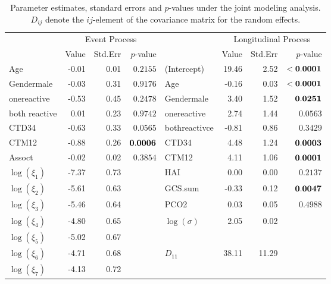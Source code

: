\documentclass{article}
\begin{document}
\begin{table}[H]
\centering
\begin{tabular}{lrrrlrrr}
  \hline
  & \multicolumn{3}{c}{Event Process} & & \multicolumn{3}{c}{Longitudinal Process}\\
  & Value & Std.Err & $p$-value &   & Value & Std.Err & $p$-value \\ 
  \hline
Age & -0.01 & 0.01 & $0.2155$ & (Intercept) & 19.46 & 2.52 & ${\bf <0.0001}$ \\ 
  Gendermale & -0.03 & 0.31 & $0.9176$ & Age & -0.16 & 0.03 & ${\bf <0.0001}$ \\ 
  onereactive & -0.53 & 0.45 & $0.2478$ & Gendermale & 3.40 & 1.52 & ${\bf 0.0251}$ \\ 
  both reactive & 0.01 & 0.23 & $0.9742$ & onereactive & 2.74 & 1.44 & $0.0563$ \\ 
  CTD34 & -0.63 & 0.33 & $0.0565$ & bothreactivce & -0.81 & 0.86 & $0.3429$ \\ 
  CTM12 & -0.88 & 0.26 & ${\bf 0.0006}$ & CTD34 & 4.48 & 1.24 & ${\bf 0.0003}$ \\ 
  Assoct & -0.02 & 0.02 & $0.3854$ & CTM12 & 4.11 & 1.06 & ${\bf 0.0001}$ \\ 
  $\log(\xi_1)$ & -7.37 & 0.73 &  & HAI & 0.00 & 0.00 & $0.2137$ \\ 
  $\log(\xi_2)$ & -5.61 & 0.63 &  & GCS.sum & -0.33 & 0.12 & ${\bf 0.0047}$ \\ 
  $\log(\xi_3)$ & -5.46 & 0.64 &  & PCO2 & 0.03 & 0.05 & $0.4988$ \\ 
  $\log(\xi_4)$ & -4.80 & 0.65 &  & $\log(\sigma)$ & 2.05 & 0.02 &  \\ 
  $\log(\xi_5)$ & -5.02 & 0.67 &  &  &  &  &  \\ 
  $\log(\xi_6)$ & -4.71 & 0.68 &  & $D_{11}$ & 38.11 & 11.29 &  \\ 
  $\log(\xi_7)$ & -4.13 & 0.72 &  &  &  &  &  \\ 
   \hline
\end{tabular}
\caption{Parameter estimates, standard errors and $p$-values under the joint modeling analysis. $D_{ij}$ denote the $ij$-element of the covariance matrix for the random effects.} 
\label{tab: jm}
\end{table}


\end{document}

